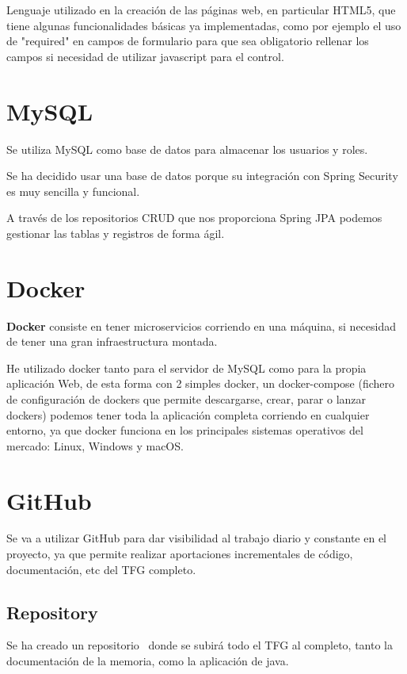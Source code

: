 Lenguaje utilizado en la creación de las páginas web, en particular HTML5, que tiene algunas funcionalidades básicas ya implementadas, como por ejemplo el uso de "required" en campos de formulario para que sea obligatorio rellenar los campos si necesidad de utilizar javascript para el control.

\section{MySQL}

Se utiliza MySQL como base de datos para almacenar los usuarios y roles.

Se ha decidido usar una base de datos porque su integración con Spring Security es muy sencilla y funcional. 

A través de los repositorios CRUD que nos proporciona Spring JPA podemos gestionar las tablas y registros de forma ágil.

\section{Docker}

\textbf{Docker} consiste en tener microservicios corriendo en una máquina, si necesidad de tener una gran infraestructura montada.

He utilizado docker tanto para el servidor de MySQL como para la propia aplicación Web, de esta forma con 2 simples docker, un docker-compose (fichero de configuración de dockers que permite descargarse, crear, parar o lanzar dockers) podemos tener toda la aplicación completa corriendo en cualquier entorno, ya que docker funciona en los principales sistemas operativos del mercado: Linux, Windows y macOS.

\section{GitHub}

Se va a utilizar GitHub para dar visibilidad al trabajo diario y constante en el proyecto, ya que permite realizar aportaciones incrementales de código, documentación, etc del TFG completo.

\subsection{Repository}

Se ha creado un repositorio~\cite{github:repo} donde se subirá todo el TFG al completo, tanto la documentación de la memoria, como la aplicación de java.

